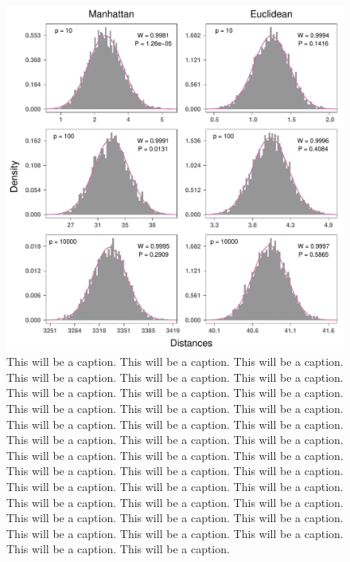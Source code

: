 \documentclass[10pt,letterpaper]{article}\usepackage[]{graphicx}\usepackage[]{color}
\begin{document}
\vspace*{0.2in}

{\Large	
	\textbf{} %
}

\begin{figure}[H]
	\includegraphics[width=\textwidth]{central_limit_hist_uniform_standard.pdf}
	\caption{This will be a caption. This will be a caption. This will be a caption. This will be a caption. This will be a caption. This will be a caption. This will be a caption. This will be a caption. This will be a caption. This will be a caption. This will be a caption. This will be a caption. This will be a caption. This will be a caption. This will be a caption. This will be a caption. This will be a caption. This will be a caption. This will be a caption. This will be a caption. This will be a caption. This will be a caption. This will be a caption. This will be a caption. This will be a caption. This will be a caption. This will be a caption. This will be a caption. This will be a caption. This will be a caption. This will be a caption. This will be a caption. This will be a caption. This will be a caption. This will be a caption. This will be a caption. This will be a caption. This will be a caption.}
\end{figure}
\end{document}
